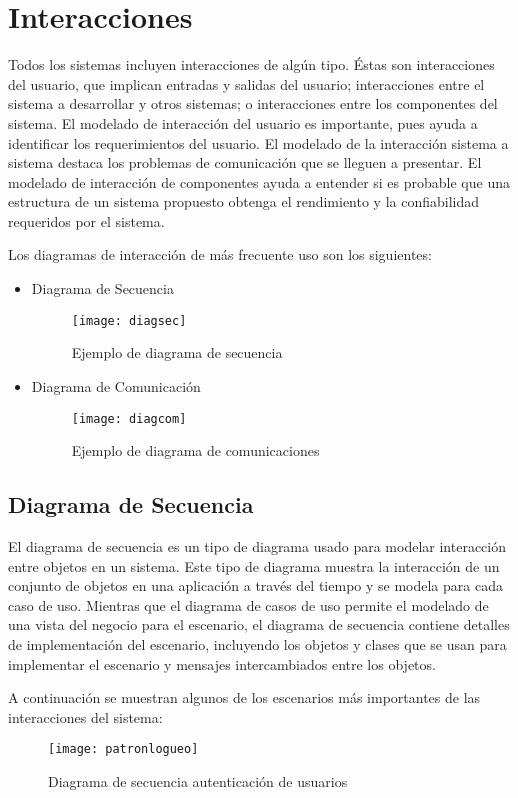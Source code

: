 \newpage

\section{Interacciones}
Todos los sistemas incluyen interacciones de algún tipo. Éstas son interacciones del usuario, que implican entradas y salidas del usuario; interacciones entre el sistema a desarrollar y otros sistemas; o interacciones entre los componentes del sistema. El modelado de interacción del usuario es importante, pues ayuda a identificar los requerimientos del usuario. El modelado de la interacción sistema a sistema destaca los problemas de comunicación que se lleguen a presentar. El modelado de interacción de componentes ayuda a entender si es probable que una estructura de un sistema propuesto obtenga el rendimiento y la confiabilidad requeridos por el sistema.\cite{modeladosistema}

Los diagramas de interacción de más frecuente uso son los siguientes:
\begin{itemize}
\item Diagrama de Secuencia
\begin{figure}[H]
	\centering
	\texttt{[image: diagsec]}
    \caption{Ejemplo de diagrama de secuencia}
	\label{fig:dseEjemplo}
\end{figure}
\item Diagrama de Comunicación
\begin{figure}[H]
	\centering
	\texttt{[image: diagcom]}
    \caption{Ejemplo de diagrama de comunicaciones}
	\label{fig:dcomEjemplo}
\end{figure}
\end{itemize}
\newpage
\subsection{Diagrama de Secuencia}
El diagrama de secuencia es un tipo de diagrama usado para modelar interacción entre objetos
en un sistema. Este tipo de diagrama muestra la interacción de un conjunto de objetos en una aplicación
a través del tiempo y se modela para cada caso de uso. Mientras que el diagrama de casos de uso
permite el modelado de una vista del negocio para el escenario, el diagrama de secuencia contiene detalles
de implementación del escenario, incluyendo los objetos y clases que se usan para implementar el
escenario y mensajes intercambiados entre los objetos.

A continuación se muestran algunos de los escenarios más importantes de las interacciones del sistema:
\begin{figure}[th!]
	\centering
	\texttt{[image: patronlogueo]}
    \centering
    \caption{Diagrama de secuencia autenticación de usuarios}
	\label{fig:patronlogueo}
\end{figure}

